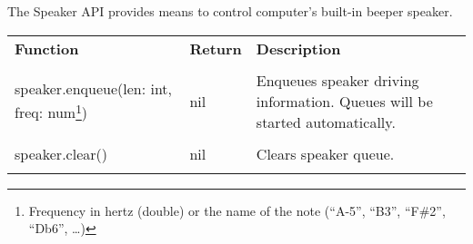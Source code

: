 The Speaker API provides means to control computer's built-in beeper speaker.

\begin{tabularx}{\textwidth}{l l X}
	\textbf{\large Function} & \textbf{\large Return} & \textbf{\large Description}
	\\ \\
	\endhead
	speaker.enqueue(len: int, freq: num\footnote{Frequency in hertz (double) or the name of the note (``A-5'', ``B3'', ``F\#2'', ``Db6'', \ldots)}) & nil & Enqueues speaker driving information. Queues will be started automatically.
	\\ \\
	speaker.clear() & nil & Clears speaker queue.
	\\ \\
\end{tabularx}